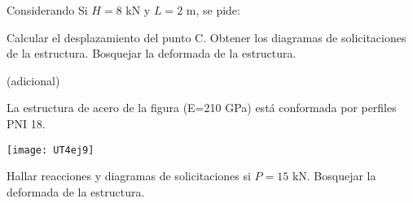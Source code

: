 Considerando Si $H=8$ kN y $L=2$ m, se pide:

\parte Calcular el desplazamiento del punto C.
\parte Obtener los diagramas de solicitaciones de la estructura.
\parte Bosquejar la deformada de la estructura.

\ejercicio (adicional) 

La estructura de acero de la figura (E=210 GPa) está conformada por perfiles PNI 18. 

\begin{center}
	\texttt{[image: UT4ej9]}
\end{center}

\parte Hallar reacciones y diagramas de solicitaciones si $P=15$ kN. 
\parte Bosquejar la deformada de la estructura.



